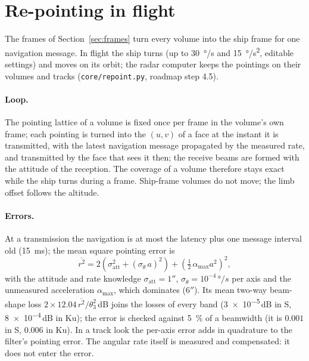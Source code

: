 \documentclass[11pt,a4paper]{article}
\newcommand{\code}[1]{\texttt{\small #1}}
\begin{document}
\section{Re-pointing in flight}\label{sec:repoint}
The frames of Section~\ref{sec:frames} turn every volume into the ship frame for one navigation message. In flight the
ship turns (up to \SI{30}{\degree/s} and \SI{15}{\degree/s^2}, editable settings) and moves on its orbit; the radar
computer keeps the pointings on their volumes and tracks (\code{core/repoint.py}, roadmap step 4.5).

\paragraph{Loop.} The pointing lattice of a volume is fixed once per frame in the volume's own frame; each pointing is
turned into the $(u,v)$ of a face at the instant it is transmitted, with the latest navigation message propagated by
the measured rate, and transmitted by the face that sees it then; the receive beams are formed with the attitude of the
reception. The coverage of a volume therefore stays exact while the ship turns during a frame. Ship-frame volumes do
not move; the limb offset follows the altitude.

\paragraph{Errors.} At a transmission the navigation is at most the latency plus one message interval old
(\SI{15}{ms}); the mean square pointing error is
\[
  \overline{r^2} = 2\left(\sigma_{\mathrm{att}}^2 + (\sigma_{\dot\theta}\,a)^2\right) + \left(\tfrac12\,\alpha_{\max}a^2\right)^2,
\]
with the attitude and rate knowledge $\sigma_{\mathrm{att}} = 1''$, $\sigma_{\dot\theta} = 10^{-4}\,\si{\degree/s}$ per
axis and the unmeasured acceleration $\alpha_{\max}$, which dominates ($6''$). Its mean two-way beam-shape loss
$2\times12.04\,\overline{r^2}/\theta_3^2$\,dB joins the losses of every band (\num{3e-5}\,dB in S, \num{8e-4}\,dB in Ku);
the error is checked against \SI{5}{\percent} of a beamwidth (it is $0.001$ in S, $0.006$ in Ku). In a track look the
per-axis error adds in quadrature to the filter's pointing error. The angular rate itself is measured and compensated:
it does not enter the error.
\end{document}
